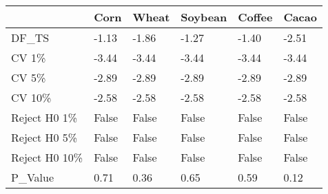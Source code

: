 \begin{tabular}{llllll}
\toprule
{} &   Corn &  Wheat & Soybean & Coffee &  Cacao \\
\midrule
DF\_TS         &  -1.13 &  -1.86 &   -1.27 &  -1.40 &  -2.51 \\
CV 1\%         &  -3.44 &  -3.44 &   -3.44 &  -3.44 &  -3.44 \\
CV 5\%         &  -2.89 &  -2.89 &   -2.89 &  -2.89 &  -2.89 \\
CV 10\%        &  -2.58 &  -2.58 &   -2.58 &  -2.58 &  -2.58 \\
Reject H0 1\%  &  False &  False &   False &  False &  False \\
Reject H0 5\%  &  False &  False &   False &  False &  False \\
Reject H0 10\% &  False &  False &   False &  False &  False \\
P\_Value       &   0.71 &   0.36 &    0.65 &   0.59 &   0.12 \\
\bottomrule
\end{tabular}
